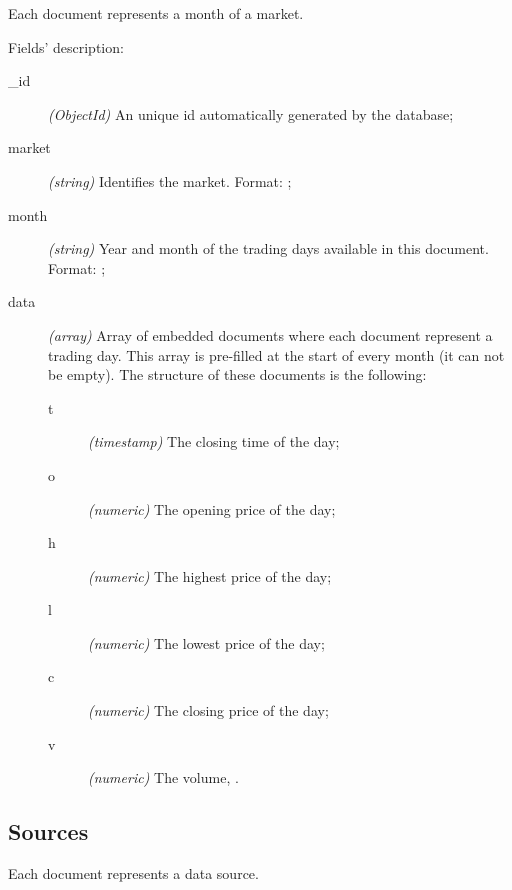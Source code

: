 

Each document represents a month of a market.

Fields' description:
\begin{description}
	\item[\_id] \textit{(ObjectId)} An unique id automatically generated by
		the database;
	\item[market] \textit{(string)} Identifies the market. Format:
		;
	\item[month] \textit{(string)} Year and month of the trading days
		available in this document. Format: ;
	\item[data] \textit{(array)} Array of embedded documents where each
		document represent a trading day. This array is pre-filled at
		the start of every month (it can not be empty). The structure of
		these documents is the following:
		\begin{description}
			\item[t] \textit{(timestamp)} The closing time of the
				day;
			\item[o] \textit{(numeric)} The opening price of the
				day;
			\item[h] \textit{(numeric)} The highest price of the
				day;
			\item[l] \textit{(numeric)} The lowest price of the day;
			\item[c] \textit{(numeric)} The closing price of the
				day;
			\item[v] \textit{(numeric)} The volume, .
		\end{description}
\end{description}

\subsection{Sources}



Each document represents a data source.

